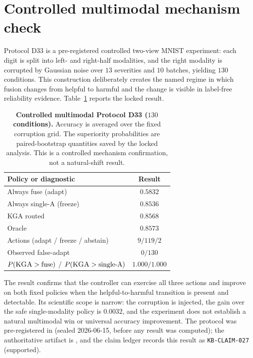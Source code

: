 \section{Controlled multimodal mechanism check}\label{app:d33}
Protocol D33 is a pre-registered controlled two-view MNIST experiment: each digit is split into
left- and right-half modalities, and the right modality is corrupted by Gaussian noise over
$13$ severities and $10$ batches, yielding $130$ conditions. This construction deliberately
creates the named regime in which fusion changes from helpful to harmful and the change is visible
in label-free reliability evidence. Table~\ref{tab:d33} reports the locked result.

\begin{table}[t]\centering\footnotesize
\caption{\textbf{Controlled multimodal Protocol D33 ($130$ conditions).} Accuracy is averaged over
the fixed corruption grid. The superiority probabilities are paired-bootstrap quantities saved by
the locked analysis. This is a controlled mechanism confirmation, not a natural-shift result.}
\label{tab:d33}
\begin{tabular}{lc}
\toprule
Policy or diagnostic & Result \\
\midrule
Always fuse (adapt) & $0.5832$ \\
Always single-A (freeze) & $0.8536$ \\
\textsc{KGA} routed & $\mathbf{0.8568}$ \\
Oracle & $0.8573$ \\
Actions (adapt / freeze / abstain) & $9 / 119 / 2$ \\
Observed false-adapt & $0/130$ \\
$P(\textsc{KGA}>\text{fuse})$ / $P(\textsc{KGA}>\text{single-A})$ & $1.000 / 1.000$ \\
\bottomrule
\end{tabular}
\end{table}

The result confirms that the controller can exercise all three actions and improve on both fixed
policies when the helpful-to-harmful transition is present and detectable. Its scientific scope is
narrow: the corruption is injected, the gain over the safe single-modality policy is $0.0032$, and
the experiment does not establish a natural multimodal win or universal accuracy improvement.
The protocol was pre-registered in
 (sealed 2026-06-15, before any
result was computed); the authoritative artifact is
, and the claim ledger records
this result as \texttt{KB-CLAIM-027} (supported).

